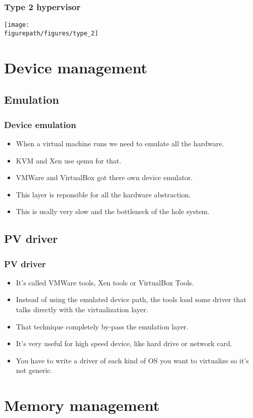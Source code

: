 \begin{frame}
\frametitle{Type 2 hypervisor}
\begin{center}
\texttt{[image: \\figurepath/figures/type\_2]}
\end{center}
\end{frame}

\section{Device management}
\subsection{Emulation}
\begin{frame}
\frametitle{Device emulation}
\begin{itemize}
\item When a virtual machine runs we need to emulate all the hardware.
\item KVM and Xen use qemu for that.
\item VMWare and VirtualBox got there own device emulator.
\item This layer is reponsible for all the hardware abstraction.
\item This is usally very slow and the bottleneck of the hole system.
\end{itemize}
\end{frame}

\subsection{PV driver}
\begin{frame}
\frametitle{PV driver}
\begin{itemize}
\item It's called VMWare tools, Xen tools or VirtualBox Tools.
\item Instead of using the emulated device path, the tools load some driver that talks directly with the virtualization layer.
\item That technique completely by-pass the emulation layer.
\item It's very useful for high speed device, like hard drive or network
card.
\item You have to write a driver of each kind of OS you want to virtualize so it's not generic.
\end{itemize}
\end{frame}

\section{Memory management}
